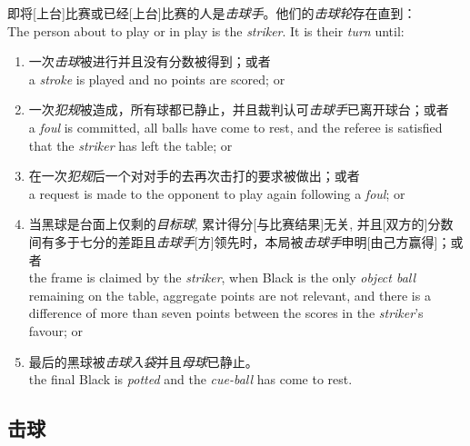\noindent 即将[上台]比赛或已经[上台]比赛的人是\emph{击球手}。他们的\emph{击球轮}存在直到：\\
The person about to play or in play is the \emph{striker}. It is their \emph{turn} until:
\begin{enumerate}[label=(\alph*)]
    \item 一次\emph{击球}被进行并且没有分数被得到；或者\\
    a \emph{stroke} is played and no points are scored; or
    \item 一次\emph{犯规}被造成，所有球都已静止，并且裁判认可\emph{击球手}已离开球台；或者\\
    a \emph{foul} is committed, all balls have come to rest, and the referee is satisfied that the \emph{striker} has left the table; or
    \item 在一次\emph{犯规}后一个对对手的去再次击打的要求被做出；或者\\
    a request is made to the opponent to play again following a \emph{foul}; or
    \item 当黑球是台面上仅剩的\emph{目标球}, 累计得分[与比赛结果]无关, 并且[双方的]分数间有多于七分的差距且\emph{击球手}[方]领先时，本局被\emph{击球手}申明[由己方赢得]；或者\\
    the frame is claimed by the \emph{striker}, when Black is the only \emph{object ball} remaining on the table, aggregate points are not relevant, and there is a difference of more than seven points between the scores in the \emph{striker}'s favour; or
    \item 最后的黑球被\emph{击球入袋}并且\emph{母球}已静止。\\
    the final Black is \emph{potted} and the \emph{cue-ball} has come to rest.
\end{enumerate}

\subsection{击球}

